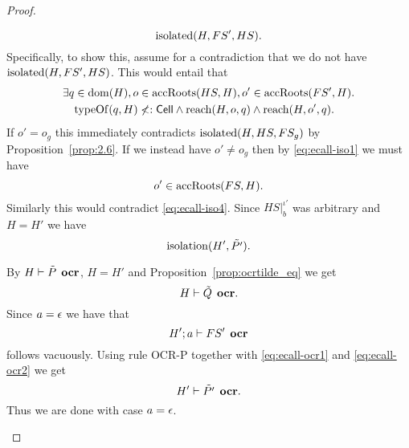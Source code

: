\begin{proof}
\begin{description}
\begin{description}
          \begin{equation}
            \mbox{$\mathrm{isolated}$}(H, FS', HS).
          \end{equation}
          Specifically, to show this, assume for a contradiction that we do not
          have $\mbox{$\mathrm{isolated}$}(H, FS', HS)$. This would entail that
          \begin{equation}
            \begin{aligned}
              \exists q &\in \mbox{$\mathrm{dom}$}(H), o \in \mbox{$\mathrm{accRoots}$}(HS, H), o' \in
              \mbox{$\mathrm{accRoots}$}(FS', H) . \\
              &\mbox{$\mathrm{typeOf}$}(q, H) \not<: \mbox{$\mathsf{Cell}$} \land \mbox{$\mathrm{reach}$}(H, o, q) \land
              \mbox{$\mathrm{reach}$}(H, o', q).
            \end{aligned}
          \end{equation}
          If $o' = o_g$ this immediately contradicts $\mbox{$\mathrm{isolated}$}(H, HS, FS_g)$ by
          Proposition~\ref{prop:2.6}. If we instead have $o' \neq o_g$ then by
          \eqref{eq:ecall-iso1} we must have
          \begin{equation}
            o' \in \mbox{$\mathrm{accRoots}$}(FS, H).
          \end{equation}
          Similarly this would contradict \eqref{eq:ecall-iso4}.  Since
          $HS|_b^{\iota'}$ was arbitrary and $H = H'$ we have 
          \begin{equation}
            \mbox{$\mathrm{isolation}$}(H', \tilde{P'}).
          \end{equation}

          By $H \vdash \tilde{P} \:\: \mbox{\bf ocr}$, $H = H'$ and
          Proposition~\ref{prop:ocrtilde_eq} we get
          \begin{equation} \label{eq:ecall-ocr1}
            H \vdash \tilde{Q} \:\: \mbox{\bf ocr}.
          \end{equation}
          Since $a = \mbox{$\epsilon$}$ we have that 
          \begin{equation} \label{eq:ecall-ocr2}
            H'; a \vdash FS' \:\: \mbox{\bf ocr} 
          \end{equation} 
          follows vacuously. Using rule {\sc OCR-P} together with
          \eqref{eq:ecall-ocr1} and \eqref{eq:ecall-ocr2} we get
          \begin{equation}
            H' \vdash \tilde{P'} \:\: \mbox{\bf ocr}.
          \end{equation}  
          Thus we are done with case $a = \mbox{$\epsilon$}$.
          

\end{description}
\end{description}
\end{proof}
